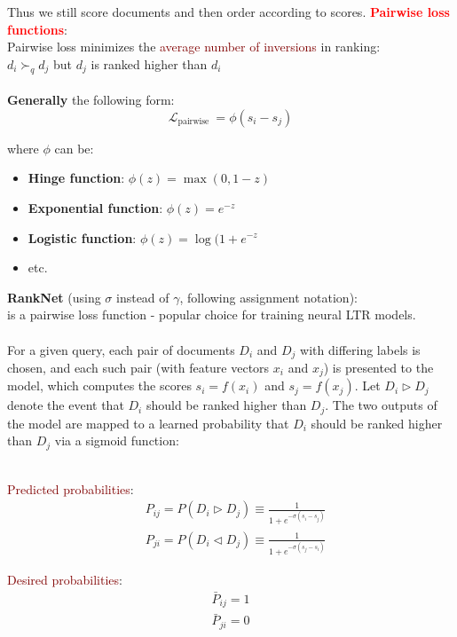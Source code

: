 Thus we still score documents and then order according to scores.
\newpage
\textbf{\textcolor{Red}{Pairwise loss functions}}: \\
Pairwise loss minimizes the \textcolor{Maroon}{average number of inversions} in ranking: \\
$d_{i} \succ_{q} d_{j}$ but $d_{j}$ is ranked higher than $d_{i}$\\
\\
\textbf{Generally} the following form: 
\begin{equation*}
    \mathcal{L}_{\text {pairwise }}=\phi\left(s_{i}-s_{j}\right)
\end{equation*}

where $\phi$ can be:
\begin{itemize}
\setlength\itemsep{0em}
    \item \textbf{Hinge function}: $\phi(z) = \max(0, 1-z)$
    \item \textbf{Exponential function}: $\phi(z) = e^{-z}$
    \item \textbf{Logistic function}: $\phi(z) = \log(1 + e^{-z}$
    \item etc.
\end{itemize}
\vspace{0.5cm}
{\Large \textbf{\textcolor{NavyBlue}{RankNet}}} (using $\sigma$ instead of $\gamma$, following assignment notation): \\
is a pairwise loss function - popular choice for training neural LTR models. \\
\\
For a given query, each pair of documents $D_{i}$ and $D_{j}$ with differing labels is chosen, and each such pair (with feature vectors $x_{i}$ and $x_{j}$) is presented to the model, which computes the scores $s_{i}=f\left(x_{i}\right)$ and $s_{j}=f\left(x_{j}\right)$. Let $D_{i} \triangleright D_{j}$ denote the event that $D_{i}$ should be ranked higher than $D_{j}$. The two outputs of the model are mapped to a learned probability that $D_{i}$ should be ranked higher than $D_{j}$ via a sigmoid function:\\
\\
\begin{minipage}{0.6\textwidth}
\textcolor{Maroon}{Predicted probabilities}:
\begin{align*}
    &P_{ij} = P(D_{i} \triangleright D_{j}) \equiv \frac{1}{1+e^{-\sigma\left(s_{i}-s_{j}\right)}} \\
    &P_{ji} = P(D_{i} \triangleleft D_{j}) \equiv \frac{1}{1+e^{-\sigma\left(s_{j}-s_{i}\right)}}
\end{align*}
\end{minipage}
\begin{minipage}{0.4\textwidth}
\textcolor{Maroon}{Desired probabilities}:
\begin{align*}
    \bar{P}_{i j}=1 \\
    \bar{P}_{ji}=0
    \\
\end{align*}
\end{minipage}

